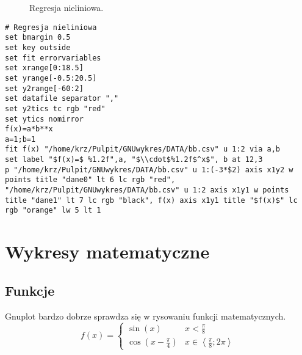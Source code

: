 \documentclass[a4paper,titlepage,12pt]{mwart}
\numberwithin{equation}{section}	%
\numberwithin{table}{section}           %
\numberwithin{figure}{section}          %
\begin{document}
\begin{figure}[!ht]
\begin{center}
\begin{scriptsize}
\end{scriptsize}
\end{center}
\caption{Regresja nieliniowa.}
\end{figure}
\begin{lstlisting}
# Regresja nieliniowa
set bmargin 0.5
set key outside
set fit errorvariables
set xrange[0:18.5]
set yrange[-0.5:20.5]
set y2range[-60:2]
set datafile separator ","
set y2tics tc rgb "red"
set ytics nomirror
f(x)=a*b**x
a=1;b=1
fit f(x) "/home/krz/Pulpit/GNUwykres/DATA/bb.csv" u 1:2 via a,b
set label "$f(x)=$ %1.2f",a, "$\\cdot$%1.2f$^x$", b at 12,3
p "/home/krz/Pulpit/GNUwykres/DATA/bb.csv" u 1:(-3*$2) axis x1y2 w points title "dane0" lt 6 lc rgb "red", "/home/krz/Pulpit/GNUwykres/DATA/bb.csv" u 1:2 axis x1y1 w points title "dane1" lt 7 lc rgb "black", f(x) axis x1y1 title "$f(x)$" lc rgb "orange" lw 5 lt 1
\end{lstlisting}

\section{Wykresy matematyczne}
\subsection{Funkcje}
Gnuplot bardzo dobrze sprawdza się w rysowaniu funkcji matematycznych. 
\begin{equation*}
f(x) = \begin{cases}
\sin(x) &x<\frac{\pi}{8}\\
\cos\left(x-\frac{\pi}{4}\right) &x\in\left\langle \frac{\pi}{8};2\pi\right\rangle
\end{cases}
\end{equation*}
\end{document}
